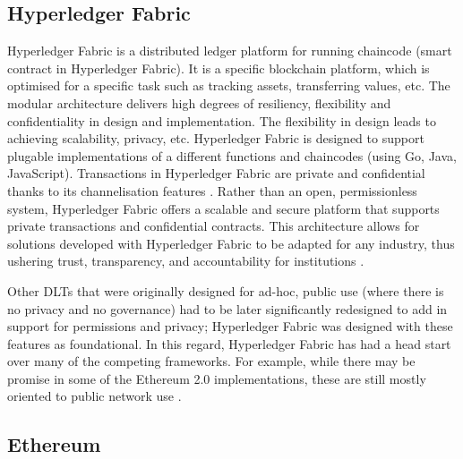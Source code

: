 
\subsection{Hyperledger Fabric}
\label{ssec:fabric}

Hyperledger Fabric \cite{hyperledger} is a distributed ledger platform for running chaincode (smart contract in Hyperledger Fabric). It is a specific blockchain platform, which is optimised for a specific task such as tracking assets, transferring values, etc. The modular architecture delivers high degrees of resiliency, flexibility and confidentiality in design and implementation. The flexibility in design leads to achieving scalability, privacy, etc. Hyperledger Fabric is designed to support plugable implementations of a different functions and chaincodes (using Go, Java, JavaScript). Transactions in Hyperledger Fabric are private and confidential thanks to its channelisation features \cite{hl_channerlisation}. Rather than an open, permissionless system, Hyperledger Fabric offers a scalable and secure platform that supports private transactions and confidential contracts. This architecture allows for solutions developed with Hyperledger Fabric to be adapted for any industry, thus ushering trust, transparency, and accountability for institutions \cite{hl_84}.

Other DLTs that were originally designed for ad-hoc, public use (where there is no privacy and no governance) had to be later significantly redesigned to add in support for permissions and privacy; Hyperledger Fabric was designed with these features as foundational. In this regard, Hyperledger Fabric has had a head start over many of the competing frameworks. For example, while there may be promise in some of the Ethereum 2.0 implementations, these are still mostly oriented to public network use \cite{hyperledger}.


\subsection{Ethereum}
\label{ssec:ethereum}

